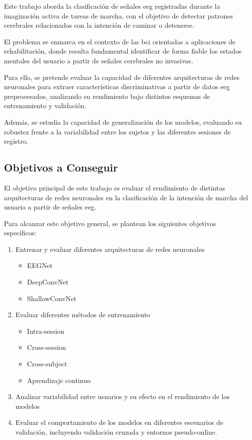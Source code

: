Este trabajo aborda la clasificación de señales \acrshort{eeg} registradas durante la imaginación activa de tareas de marcha, con el objetivo de detectar patrones cerebrales relacionados con la intención de caminar o detenerse.

El problema se enmarca en el contexto de las \acrshort{bci} orientadas a aplicaciones de rehabilitación, donde resulta fundamental identificar de forma fiable los estados mentales del usuario a partir de señales cerebrales no invasivas.

Para ello, se pretende evaluar la capacidad de diferentes arquitecturas de redes neuronales para extraer características discriminativas a partir de datos \acrshort{eeg} preprocesados, analizando su rendimiento bajo distintos esquemas de entrenamiento y validación.

Además, se estudia la capacidad de generalización de los modelos, evaluando su robustez frente a la variabilidad entre los sujetos y las diferentes sesiones de registro.

\subsection{Objetivos a Conseguir}

El objetivo principal de este trabajo es evaluar el rendimiento de distintas arquitecturas de redes neuronales en la clasificación de la intención de marcha del usuario a partir de señales \acrshort{eeg}.

Para alcanzar este objetivo general, se plantean los siguientes objetivos específicos:

\begin{enumerate}
    \item  Entrenar y evaluar diferentes arquitecturas de redes neuronales
          \begin{itemize}
              \item EEGNet
              \item DeepConvNet
              \item ShallowConvNet
          \end{itemize}
    \item Evaluar diferentes métodos de entrenamiento
          \begin{itemize}
              \item Intra-session
              \item Cross-session
              \item Cross-subject
              \item Aprendizaje continuo
          \end{itemize}
    \item Analizar variabilidad entre usuarios y su efecto en el rendimiento de los modelos
    \item Evaluar el comportamiento de los modelos en diferentes escenarios de validación, incluyendo validación cruzada y entornos pseudo-online.
\end{enumerate}
